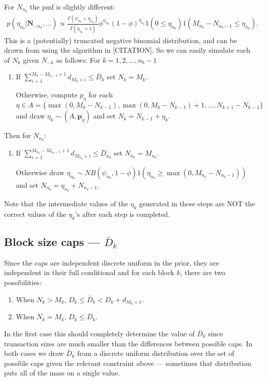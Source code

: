 \documentclass{article}
\begin{document}
For $N_{n_b}$ the pmf is slightly different:
\begin{align*}
p(\eta_{n_b}|\bm{N}_{-{n_b}}, \dots) \propto \frac{\Gamma(\psi_{n_b} + \eta_{n_b})}{\Gamma(\eta_{n_b} + 1)} \phi^{\psi_{n_b}}(1-\phi)^{\eta_{n_b}}1(0\le \eta_{n_b})1(M_{n_b} - N_{n_b-1}\le \eta_{n_b}).
\end{align*}
This is a (potentially) truncated negative binomial distribution, and can be drawn from using the algorithm in [CITATION].
So we can easily simulate each of $N_k$ given $N_{-k}$ as follows: For $k=1,2,\dots,n_b-1$
\begin{enumerate}
\item If $\sum_{i=1}^{M_k - M_{k-1} + 1} d_{M_k + i} \le \bar{D}_k$ set $N_k = M_k$.

Otherwise, compute $p_\eta$ for each $\eta \in A = \{ \max(0, M_k - N_{k-1}), \max(0, M_k - N_{k-1}) + 1, \dots, N_{k+1} - N_{k-1}\}$ and draw $\eta_k\sim (A,\bm{p}_\eta)$ and set $N_k = N_{k-1} + \eta_k$.
\end{enumerate}
Then for $N_{n_b}$:
\begin{enumerate}
\item If $\sum_{i=1}^{M_{n_b} - M_{n_b-1} + 1} d_{M_{n_b} + i} \le \bar{D}_{n_b}$ set $N_{n_b} = M_{n_b}$.

Otherwise draw $\eta_{n_b}\sim NB(\psi_{n_b}, 1-\phi)1(\eta_{n_b}\ge \max(0, M_{n_b} - N_{n_b-1}))$ and set $N_{n_b} = \eta_{n_b} + N_{n_b - 1}$.
\end{enumerate}
Note that the intermediate values of the $\eta_k$ generated in these steps are NOT the correct values of the $\eta_k$'s after each step is completed.

\subsection{Block size caps --- $\bar{D}_k$}
Since the caps are independent discrete uniform in the prior, they are independent in their full conditional and for each block $k$, there are two possibilities:
\begin{enumerate}
\item When $N_k > M_k$, $D_k \le \bar{D}_k < D_k + d_{M_k+1}$.
\item When $N_k = M_k$, $D_k \le \bar{D}_k$.
\end{enumerate}
In the first case this should completely determine the value of $\bar{D}_k$ since transaction sizes are much smaller than the differences between possible caps. In both cases we draw $\bar{D}_k$ from a discrete uniform distribution over the set of possible caps given the relevant constraint above --- sometimes that distribution puts all of the mass on a single value.
\end{document}
